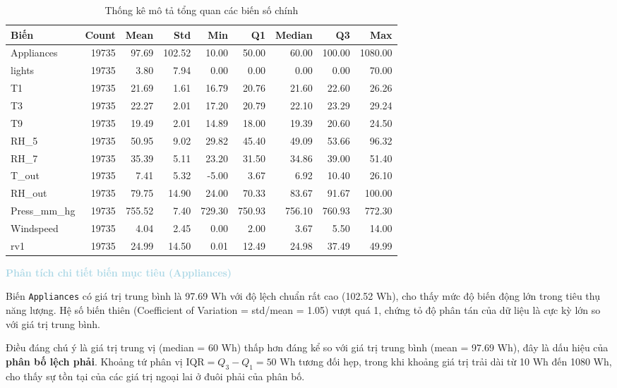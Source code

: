 \begin{table}[H]
\centering
\caption{Thống kê mô tả tổng quan các biến số chính}
\label{tab:descriptive_stats}
\small
\begin{tabular}{lrrrrrrrr}
\hline
\textbf{Biến} & \textbf{Count} & \textbf{Mean} & \textbf{Std} & \textbf{Min} & \textbf{Q1} & \textbf{Median} & \textbf{Q3} & \textbf{Max} \\
\hline
Appliances & 19735 & 97.69 & 102.52 & 10.00 & 50.00 & 60.00 & 100.00 & 1080.00 \\
lights & 19735 & 3.80 & 7.94 & 0.00 & 0.00 & 0.00 & 0.00 & 70.00 \\
T1 & 19735 & 21.69 & 1.61 & 16.79 & 20.76 & 21.60 & 22.60 & 26.26 \\
T3 & 19735 & 22.27 & 2.01 & 17.20 & 20.79 & 22.10 & 23.29 & 29.24 \\
T9 & 19735 & 19.49 & 2.01 & 14.89 & 18.00 & 19.39 & 20.60 & 24.50 \\
RH\_5 & 19735 & 50.95 & 9.02 & 29.82 & 45.40 & 49.09 & 53.66 & 96.32 \\
RH\_7 & 19735 & 35.39 & 5.11 & 23.20 & 31.50 & 34.86 & 39.00 & 51.40 \\
T\_out & 19735 & 7.41 & 5.32 & -5.00 & 3.67 & 6.92 & 10.40 & 26.10 \\
RH\_out & 19735 & 79.75 & 14.90 & 24.00 & 70.33 & 83.67 & 91.67 & 100.00 \\
Press\_mm\_hg & 19735 & 755.52 & 7.40 & 729.30 & 750.93 & 756.10 & 760.93 & 772.30 \\
Windspeed & 19735 & 4.04 & 2.45 & 0.00 & 2.00 & 3.67 & 5.50 & 14.00 \\
rv1 & 19735 & 24.99 & 14.50 & 0.01 & 12.49 & 24.98 & 37.49 & 49.99 \\
\hline
\end{tabular}
\end{table}

\vspace{0.5em}
\noindent\textcolor{lightblue}{\textbf{Phân tích chi tiết biến mục tiêu (Appliances)}}
\vspace{0.5em}

Biến \texttt{Appliances} có giá trị trung bình là 97.69 Wh với độ lệch chuẩn rất cao (102.52 Wh), cho thấy mức độ biến động lớn trong tiêu thụ năng lượng. Hệ số biến thiên (Coefficient of Variation = std/mean = 1.05) vượt quá 1, chứng tỏ độ phân tán của dữ liệu là cực kỳ lớn so với giá trị trung bình. 

Điều đáng chú ý là giá trị trung vị (median = 60 Wh) thấp hơn đáng kể so với giá trị trung bình (mean = 97.69 Wh), đây là dấu hiệu của \textbf{phân bố lệch phải}. Khoảng tứ phân vị $\text{IQR} = Q_3 - Q_1 = 50$ Wh tương đối hẹp, trong khi khoảng giá trị trải dài từ 10 Wh đến 1080 Wh, cho thấy sự tồn tại của các giá trị ngoại lai ở đuôi phải của phân bố.

